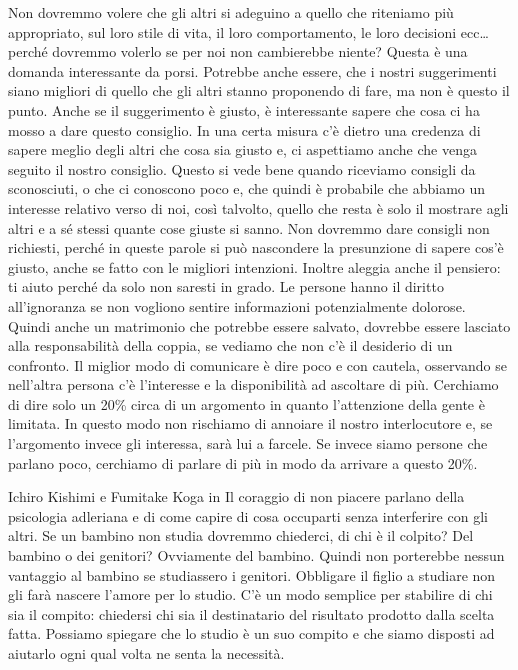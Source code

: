 \documentclass[12pt]{book} %
\begin{document}
Non dovremmo volere che gli altri si adeguino a quello che
riteniamo più appropriato, sul loro stile di vita, il loro comportamento, le loro decisioni ecc… perché dovremmo
volerlo se per noi non cambierebbe niente? Questa è una domanda interessante da porsi. Potrebbe anche essere, che i
nostri suggerimenti siano migliori di quello che gli altri stanno proponendo di fare, ma non è questo il punto. Anche
se il suggerimento è giusto, è interessante sapere che cosa ci ha mosso a dare questo consiglio. In una certa misura
c'è dietro una credenza di sapere meglio degli altri che cosa sia giusto e, ci aspettiamo anche
che venga seguito il nostro consiglio. Questo si vede bene quando riceviamo consigli da sconosciuti, 
o che ci conoscono poco e, che quindi è probabile che abbiamo un interesse relativo verso di noi, così talvolto, quello che resta è solo il mostrare agli altri e a sé stessi quante cose giuste si sanno. Non dovremmo dare consigli non richiesti, perché in queste parole si può nascondere la presunzione di
sapere cos'è giusto, anche se fatto con le migliori intenzioni. Inoltre aleggia anche il pensiero:
ti aiuto perché da solo non saresti in grado.
Le persone hanno il diritto all'ignoranza se non vogliono sentire informazioni potenzialmente
dolorose. Quindi anche un matrimonio che potrebbe essere salvato, dovrebbe essere lasciato alla responsabilità della
coppia, se vediamo che non c'è il desiderio di un confronto. Il miglior modo di comunicare è dire
poco e con cautela, osservando se nell'altra persona c'è l'interesse e la disponibilità ad ascoltare di più.
Cerchiamo di dire solo un 20\% circa di un argomento in quanto l'attenzione della gente è limitata. In questo modo non rischiamo di annoiare il nostro interlocutore e, se l'argomento invece gli interessa, sarà lui a farcele. Se invece siamo persone che parlano poco, cerchiamo di parlare di più in modo da arrivare a questo 20\%.

Ichiro Kishimi e Fumitake Koga in Il coraggio di non piacere parlano
della psicologia adleriana e di come capire di cosa occuparti senza interferire con gli altri. Se un bambino non studia
dovremmo chiederci, di chi è il colpito? Del bambino o dei genitori? Ovviamente del bambino. Quindi non porterebbe
nessun vantaggio al bambino se studiassero i genitori. Obbligare il figlio a studiare non gli farà nascere l'amore per
lo studio. C'è un modo semplice per stabilire di chi sia il compito: chiedersi chi sia il
destinatario del risultato prodotto dalla scelta fatta. Possiamo spiegare che lo studio è un suo compito e che siamo
disposti ad aiutarlo ogni qual volta ne senta la necessità.
\end{document}
